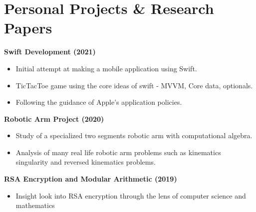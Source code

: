 \section{\sc Personal Projects \& Research Papers}

{\bf{Swift Development} (2021)}\\
\begin{itemize}
\setlength\itemsep{0em}
\item Initial attempt at making a mobile application using Swift.
\item TicTacToe game using the core ideas of swift - MVVM, Core data, optionals.
\item Following the guidance of Apple's application policies. 
\end{itemize}

{\bf{Robotic Arm Project} (2020)}\\
\begin{itemize}
\setlength\itemsep{0em}
\item Study of a specialized two segments robotic arm with computational algebra.
\item Analysis of many real life robotic arm problems such as kinematics singularity and reversed kinematics problems. 
\end{itemize}

{\bf{RSA Encryption and Modular Arithmetic} (2019)}\\
\begin{itemize}
\setlength\itemsep{0em}
\item Insight look into RSA encryption through the lens of computer science and mathematics
\end{itemize}



\endinput